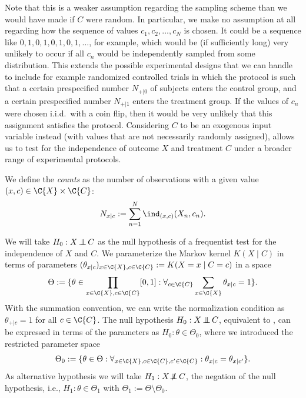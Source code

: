 Note that this is a weaker assumption regarding the sampling scheme than
we would have made if $C$ were random. In particular, we make no assumption
at all regarding how the sequence of values $c_1,c_2,\dots,c_N$ is chosen.
It could be a sequence like $0,1,0,1,0,1,0,1,\dots$, for example, which would
be (if sufficiently long) very unlikely to occur if all $c_n$ would be independently
sampled from some distribution. This extends the possible experimental designs that
we can handle to include for example randomized controlled trials in which the 
protocol is such that a certain prespecified number $N_{+|0}$ of subjects enters the control
group, and a certain prespecified number $N_{+|1}$ enters the treatment group. If the values
of $c_n$ were chosen i.i.d.\ with a coin flip, then it would be very unlikely that
this assignment satisfies the protocol. Considering $C$ to be an exogenous input
variable instead (with values that are not necessarily randomly assigned), allows us to test for the 
independence of outcome $X$ and treatment $C$ under a broader range of experimental
protocols.

We define the \emph{counts} as the number of observations with a given value $(x,c)\in\C{X}\times\C{C}$:
$$N_{x|c} := \sum_{n=1}^N \ind_{(x,c)}(X_n,c_n).$$

We will take $H_0 : X \operatorname*{\perp\mkern-11mu\perp} C$ as the null hypothesis of a frequentist test for the independence of $X$ and $C$.
We parameterize the Markov kernel $K(X \mid C)$ in terms of parameters
$(\theta_{x|c})_{x\in\C{X},c\in\C{C}} := K(X = x \mid C = c)$ in a space
$$\Theta := %
\{ \theta \in \prod_{x\in\C{X},c\in\C{C}} [0,1] : \forall_{c\in\C{C}} \sum_{x\in\C{X}} \theta_{x|c} = 1\}.$$
With the summation convention, we can write the normalization condition as $\theta_{+|c} = 1$ for all $c \in \C{C}$.
The null hypothesis $H_0 : X \operatorname*{\perp\mkern-11mu\perp} C$, equivalent to , can be expressed
in terms of the parameters as $H_0 : \theta \in \Theta_0$, where we introduced the restricted parameter space
$$\Theta_0 := \{ \theta \in \Theta : \forall_{x\in\C{X},c\in\C{C},c'\in\C{C}}: \theta_{x|c} = \theta_{x|c'} \}.$$
As alternative hypothesis we will take $H_1 : X \operatorname*{\not\mkern-2mu\perp\mkern-11mu\perp} C$, the negation of the null hypothesis, i.e.,
$H_1 : \theta \in \Theta_1$ with $\Theta_1 := \Theta \setminus \Theta_0$.

